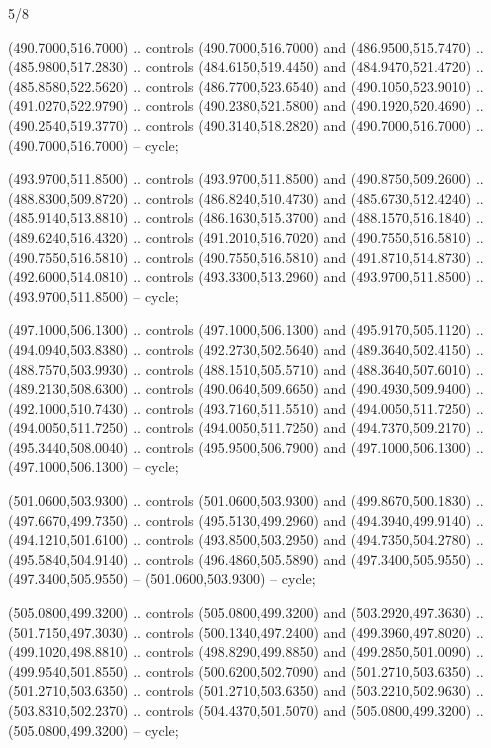 \begin{flagdescription}{5/8}
\begin{scope}[shift={(m)}]
\begin{scope}[scale=\flagwidth/220,y=0.1mm, x=0.1mm, yscale=-1,shift={(-596,-360)}]
\begin{scope}[cm={{-1.0,0.0,0.0,1.0,(1193.9797,0.0)}}]
\begin{scope}[draw=black,line join=round,line cap=round,line width=0.381\lw]
\begin{scope}[fill=olive]
 (490.7000,516.7000) .. controls (490.7000,516.7000) and
  (486.9500,515.7470) .. (485.9800,517.2830) .. controls (484.6150,519.4450) and
  (484.9470,521.4720) .. (485.8580,522.5620) .. controls (486.7700,523.6540) and
  (490.1050,523.9010) .. (491.0270,522.9790) .. controls (490.2380,521.5800) and
  (490.1920,520.4690) .. (490.2540,519.3770) .. controls (490.3140,518.2820) and
  (490.7000,516.7000) .. (490.7000,516.7000) -- cycle;

 (493.9700,511.8500) .. controls (493.9700,511.8500) and
  (490.8750,509.2600) .. (488.8300,509.8720) .. controls (486.8240,510.4730) and
  (485.6730,512.4240) .. (485.9140,513.8810) .. controls (486.1630,515.3700) and
  (488.1570,516.1840) .. (489.6240,516.4320) .. controls (491.2010,516.7020) and
  (490.7550,516.5810) .. (490.7550,516.5810) .. controls (490.7550,516.5810) and
  (491.8710,514.8730) .. (492.6000,514.0810) .. controls (493.3300,513.2960) and
  (493.9700,511.8500) .. (493.9700,511.8500) -- cycle;

 (497.1000,506.1300) .. controls (497.1000,506.1300) and
  (495.9170,505.1120) .. (494.0940,503.8380) .. controls (492.2730,502.5640) and
  (489.3640,502.4150) .. (488.7570,503.9930) .. controls (488.1510,505.5710) and
  (488.3640,507.6010) .. (489.2130,508.6300) .. controls (490.0640,509.6650) and
  (490.4930,509.9400) .. (492.1000,510.7430) .. controls (493.7160,511.5510) and
  (494.0050,511.7250) .. (494.0050,511.7250) .. controls (494.0050,511.7250) and
  (494.7370,509.2170) .. (495.3440,508.0040) .. controls (495.9500,506.7900) and
  (497.1000,506.1300) .. (497.1000,506.1300) -- cycle;

 (501.0600,503.9300) .. controls (501.0600,503.9300) and
  (499.8670,500.1830) .. (497.6670,499.7350) .. controls (495.5130,499.2960) and
  (494.3940,499.9140) .. (494.1210,501.6100) .. controls (493.8500,503.2950) and
  (494.7350,504.2780) .. (495.5840,504.9140) .. controls (496.4860,505.5890) and
  (497.3400,505.9550) .. (497.3400,505.9550) -- (501.0600,503.9300) -- cycle;

 (505.0800,499.3200) .. controls (505.0800,499.3200) and
  (503.2920,497.3630) .. (501.7150,497.3030) .. controls (500.1340,497.2400) and
  (499.3960,497.8020) .. (499.1020,498.8810) .. controls (498.8290,499.8850) and
  (499.2850,501.0090) .. (499.9540,501.8550) .. controls (500.6200,502.7090) and
  (501.2710,503.6350) .. (501.2710,503.6350) .. controls (501.2710,503.6350) and
  (503.2210,502.9630) .. (503.8310,502.2370) .. controls (504.4370,501.5070) and
  (505.0800,499.3200) .. (505.0800,499.3200) -- cycle;


\end{scope}
\end{scope}
\end{scope}
\end{scope}
\end{scope}
\end{flagdescription}
